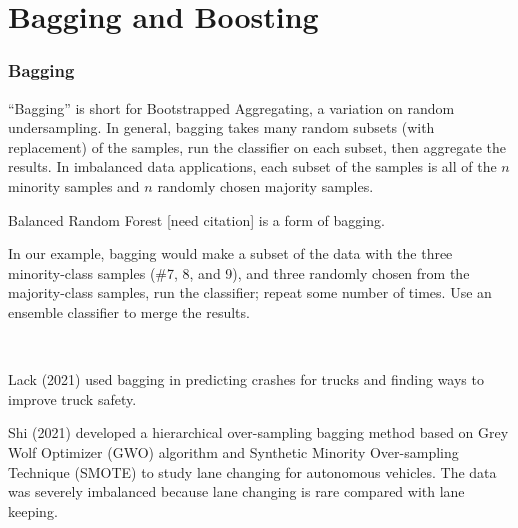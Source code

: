 \section{Bagging and Boosting}

\subsubsection{Bagging}

``Bagging'' is short for Bootstrapped Aggregating, a variation on random undersampling. \cite{BRIEMAN_1996}  In general, bagging takes many random subsets (with replacement) of the samples, run the classifier on each subset, then aggregate the results.  In imbalanced data applications, each subset of the samples is all of the $n$ minority samples and $n$ randomly chosen majority samples.  

Balanced Random Forest [need citation] is a form of bagging.  

In our example, bagging would make a subset of the data with the three minority-class samples (\#7, 8, and 9), and three randomly chosen from the majority-class samples, run the classifier; repeat some number of times.  Use an ensemble classifier to merge the results.  

\begin{center}
\end{center}

\

Lack (2021)  used bagging in predicting crashes for trucks and finding ways to improve truck safety.  \cite{LACK2021106105}

Shi (2021) developed a
hierarchical over-sampling bagging method based on Grey Wolf Optimizer (GWO) algorithm and Synthetic Minority Over-sampling Technique (SMOTE)
to study lane changing for autonomous vehicles.  The data was severely imbalanced because lane changing is rare compared with lane keeping.  \cite{SHI2021103414}

